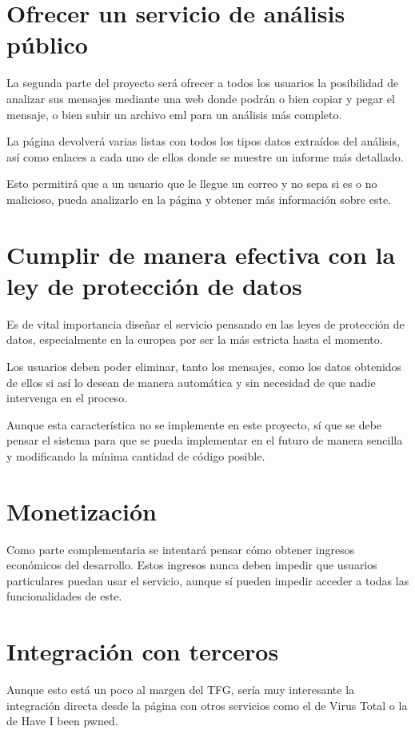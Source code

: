 \section{Ofrecer un servicio de análisis público}
La segunda parte del proyecto será ofrecer a todos los usuarios la posibilidad de analizar sus mensajes mediante una web donde podrán o bien copiar y pegar el mensaje, o bien subir un archivo eml para un análisis más completo. 

La página devolverá varias listas con todos los tipos datos extraídos del análisis, así como enlaces a cada uno de ellos donde se muestre un informe más detallado.

Esto permitirá que a un usuario que le llegue un correo y no sepa si es o no malicioso, pueda analizarlo en la página y obtener más información sobre este.

\section{Cumplir de manera efectiva con la ley de protección de datos}
Es de vital importancia diseñar el servicio pensando en las leyes de protección de datos, especialmente en la europea por ser la más estricta hasta el momento. 

Los usuarios deben poder eliminar, tanto los mensajes, como los datos obtenidos de ellos si así lo desean de manera automática y sin necesidad de que nadie intervenga en el proceso. 

Aunque esta característica no se implemente en este proyecto, sí que se debe pensar el sistema para que se pueda implementar en el futuro de manera sencilla y modificando la mínima cantidad de código posible. 

\section{Monetización}
Como parte complementaria se intentará pensar cómo obtener ingresos económicos del desarrollo. Estos ingresos nunca deben impedir que usuarios particulares puedan usar el servicio, aunque sí pueden impedir acceder a todas las funcionalidades de este. 

\section{Integración con terceros}
Aunque esto está un poco al margen del TFG, sería muy interesante la integración directa desde la página con otros servicios como el de Virus Total o la de Have I been pwned.

